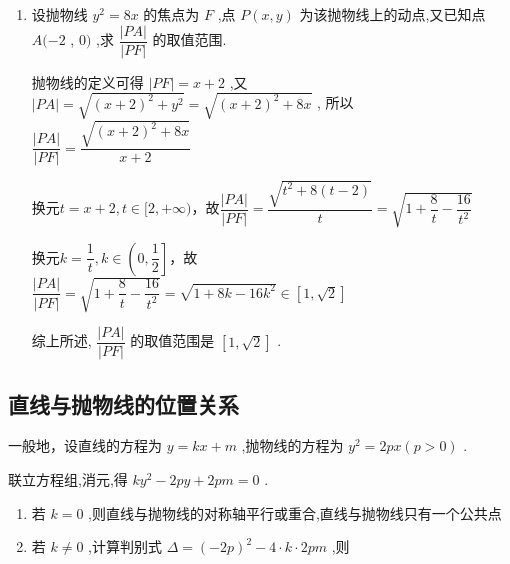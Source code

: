\begin{enumerate}
\begin{jieda}
    因为 $a > 0,{x}_{0} \geq  0$，所以
    \end{jieda}
    \item 设抛物线 ${y}^{2} = {8x}$ 的焦点为 $F$ ,点 $P\left( {x,y}\right)$ 为该抛物线上的动点,又已知点 $A( - 2$ , $0)$ ,求 $\dfrac{\left| PA\right| }{\left| PF\right| }$ 的取值范围.
    
    \begin{jieda}
        抛物线的定义可得 $\left| {PF}\right|  = x + 2$ ,又 $\left| {PA}\right|  = \sqrt{{\left( x + 2\right) }^{2} + {y}^{2}} = \sqrt{{\left( x + 2\right) }^{2} + {8x}}$ , 所以$\dfrac{\left| PA\right| }{\left| PF\right| } = \dfrac{\sqrt{{\left( x + 2\right) }^{2} + {8x}}}{x + 2}$

        换元$t = x+2, t \in [2, +\infty)$，故$\dfrac{\left| PA\right| }{\left| PF\right| } = \dfrac{\sqrt{t^{2} + 8(t-2)}}{t} = \sqrt{1+\dfrac{8}{t} - \dfrac{16}{t^2}}$

        换元$k = \dfrac{1}{t}, k \in \left(0, \dfrac{1}{2}\right]$，故$\dfrac{\left| PA\right| }{\left| PF\right| } =  \sqrt{1+\dfrac{8}{t} - \dfrac{16}{t^2}} = \sqrt{1+8k-16k^2} \in \left\lbrack  {1,\sqrt{2}}\right\rbrack$

        综上所述, $\dfrac{\left| PA\right| }{\left| PF\right| }$ 的取值范围是 $\left\lbrack  {1,\sqrt{2}}\right\rbrack$ .
    \end{jieda}
\end{enumerate}

\subsection*{直线与抛物线的位置关系}
一般地，设直线的方程为 $y = {kx} + m$ ,抛物线的方程为 ${y}^{2} = {2px}\left( {p > 0}\right)$ .

联立方程组,消元,得 $k{y}^{2} - {2py} + {2pm} = 0$ .

\begin{enumerate}
    \item 若 $k = 0$ ,则直线与抛物线的对称轴平行或重合,直线与抛物线只有一个公共点
    \item 若 $k \neq  0$ ,计算判别式 $\Delta  = {\left( -2p\right) }^{2} - 4 \cdot  k \cdot  {2pm}$ ,则
\end{enumerate}


